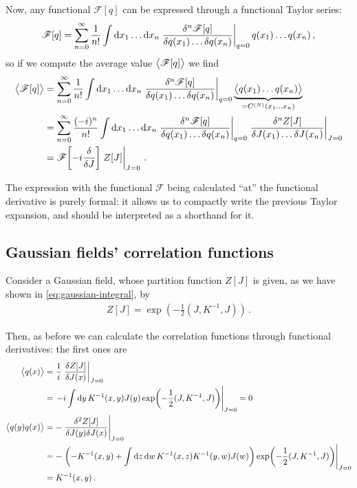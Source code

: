 \documentclass[main.tex]{subfiles}
\begin{document}
Now, any functional \(\mathscr{F} [q]\) can be expressed through a functional Taylor series:
%
\begin{align}
\mathscr{F}[q] = \sum _{n=0}^{\infty } \frac{1}{n!}
\int \dd{x_1} \dots \dd{x_n} \eval{\frac{ \delta^{n} \mathscr{F}[q]}{ \delta q(x_1) \dots \delta q(x_n)}}_{q = 0} q(x_1) \dots q(x_n)
\,,
\end{align}
%
so if we compute the average value \(\expval{\mathscr{F}[q]}\) we find 
%
\begin{align}
\expval{\mathscr{F}[q]} &= 
\sum _{n=0}^{\infty } \frac{1}{n!}
\int \dd{x_1} \dots \dd{x_n} \eval{\frac{ \delta^{n} \mathscr{F}[q]}{ \delta q(x_1) \dots \delta q(x_n)}}_{q = 0} \underbrace{\expval{q(x_1) \dots q(x_n)}}_{= C^{(N)} (x_1 \dots x_n)}  \\
&=\sum _{n=0}^{\infty } \frac{(-i)^{n}}{n!}
\int \dd{x_1} \dots \dd{x_n} \eval{\frac{ \delta^{n} \mathscr{F}[q]}{ \delta q(x_1) \dots \delta q(x_n)}}_{q = 0} 
\eval{\frac{ \delta^{n} Z[J]}{ \delta J(x_1 )\dots \delta J(x_n)}}_{J =0 } \\
&= \mathscr{F}\qty[ -i \fdv{}{J}]\eval{ Z[J]}_{J=0}
\,.
\end{align}

The expression with the functional \(\mathscr{F}\) being calculated ``at'' the functional derivative is purely formal: it allows us to compactly write the previous Taylor expansion, and should be interpreted as a shorthand for it.  

\subsection{Gaussian fields' correlation functions}

Consider a Gaussian field, whose partition function \(Z[J]\) is given, as we have shown in \eqref{eq:gaussian-integral}, by 
%
\begin{align}
Z[J] = \exp( - \frac{1}{2} (J, K^{-1}, J))
\,.
\end{align}

Then, as before we can calculate the correlation functions through functional derivatives: the first ones are 
%
\begin{align}
\expval{q(x)} &= \frac{1}{i} \eval{\fdv{Z[J]}{J(x)}}_{J=0}  \\
&= \eval{-i \int \dd{y} K^{-1}(x, y) J(y) \exp(- \frac{1}{2} (J, K^{-1}, J))}_{J =0} =0\\
\expval{q(y)q(x)} &= -\eval{\frac{ \delta^2 Z[J]}{ \delta  J(y) \delta  J (x)}}_{J=0} \\
&= -\eval{\qty(-K^{-1}(x, y) + \int \dd{z} \dd{w} K^{-1} (x, z)K^{-1} (y, w) J(w))\exp(- \frac{1}{2} (J, K^{-1}, J))}_{J =0}  \\
&= K^{-1} (x, y)
\,.
\end{align}
\end{document}
